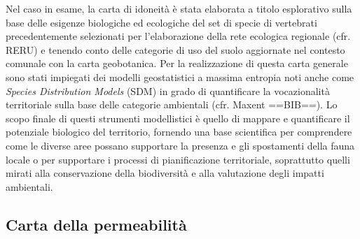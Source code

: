 \documentclass[
]{book}
\begin{document}
Nel caso in esame, la carta di idoneità è stata elaborata a titolo esplorativo sulla base delle esigenze biologiche ed ecologiche del set di specie di vertebrati precedentemente selezionati per l'elaborazione della rete ecologica regionale (cfr. RERU) e tenendo conto delle categorie di uso del suolo aggiornate nel contesto comunale con la carta geobotanica.
Per la realizzazione di questa carta generale sono stati impiegati dei modelli geostatistici a massima entropia noti anche come \emph{Species Distribution Models} (SDM) in grado di quantificare la vocazionalità territoriale sulla base delle categorie ambientali (cfr. Maxent ==BIB==).
Lo scopo finale di questi strumenti modellistici è quello di mappare e quantificare il potenziale biologico del territorio, fornendo una base scientifica per comprendere come le diverse aree possano supportare la presenza e gli spostamenti della fauna locale o per supportare i processi di pianificazione territoriale, soprattutto quelli mirati alla conservazione della biodiversità e alla valutazione degli impatti ambientali.

\subsection{Carta della permeabilità}\label{carta-della-permeabilituxe0}
\end{document}
